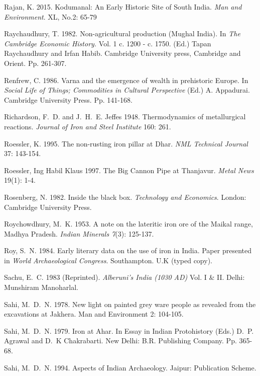 \begin{thebibliography}{99}
 Rajan, K. 2015. Kodumanal: An Early Historic Site of South India. \textit{Man and Environment}. XL, No.2: 65-79

 Raychaudhury, T. 1982. Non-agricultural production (Mughal India). In \textit{The Cambridge Economic History.} Vol. 1 c. 1200 - c. 1750. (Ed.) Tapan Raychaudhury and Irfan Habib. Cambridge University press, Cambridge and Orient. Pp. 261-307.

 Renfrew, C. 1986. Varna and the emergence of wealth in prehistoric Europe. In \textit{Social Life of Things; Commodities in Cultural Perspective} (Ed.) A. Appadurai. Cambridge University Press. Pp. 141-168. 

 Richardson, F.~D. and J.~H.~E. Jeffes 1948. Thermodynamics of metallurgical reactions. \textit{Journal of Iron and Steel Institute} 160:  261.

 Roessler, K. 1995. The non-rusting iron pillar at Dhar. \textit{NML Technical Journal} 37: 143-154. 

 Roessler, Ing Habil Klaus 1997. The Big Cannon Pipe at Thanjavur. \textit{Metal News} 19(1): 1-4. 

 Rosenberg, N. 1982. Inside the black box. \textit{Technology and Economics}. London: Cambridge University Press.

 Roychowdhury, M.~K. 1953. A note on the lateritic iron ore of the Maikal range, Madhya Pradesh. \textit{Indian Minerals 7}(3): 125-137.

 Roy, S.~N. 1984. Early literary data on the use of iron in India. Paper presented in \textit{World Archaeological Congress}. Southampton. U.K (typed copy).

 Sachu, E.~C. 1983 (Reprinted). \textit{Alberuni's India (1030 AD)} Vol. I \& II. Delhi: Munshiram Manoharlal.

 Sahi, M.~D.~N. 1978. New light on painted grey ware people as revealed from the excavations at Jakhera. Man and Environment 2: 104-105. 

 Sahi, M.~D.~N. 1979. Iron at Ahar. In Essay in Indian Protohistory (Eds.) D.~P. Agrawal and D.~K Chakrabarti. New Delhi: B.R. Publishing Company. Pp. 365-68.

 Sahi, M.~D.~N. 1994. Aspects of Indian Archaeology. Jaipur: Publication Scheme. 


\end{thebibliography}
